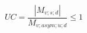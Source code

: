\documentclass[12pt]{article}
\begin{document}
\begin{displaymath}
UC = \frac {|M_{v;s;d}|} {M_{v;asym;u;d}} \leq 1
\end{displaymath}
\end{document}
